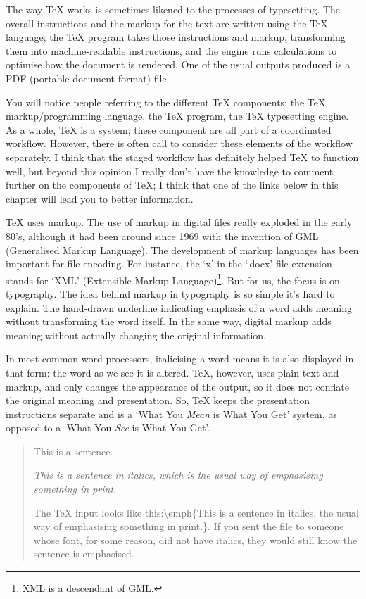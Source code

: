 \documentclass[11pt, oneside]{memoir}
\begin{document}
The way TeX works is sometimes likened to the processes of typesetting. The overall instructions and the markup for the text are written using the TeX language; the TeX program takes those instructions and markup, transforming them into machine-readable instructions, and the engine runs calculations to optimise how the document is rendered. One of the usual outputs produced is a PDF (portable document format) file.

You will notice people referring to the different TeX components: the TeX markup/programming language, the TeX program, the TeX typesetting engine. As a whole, TeX is a system; these component are all part of a coordinated workflow. However, there is often call to consider these elements of the workflow separately. I think that the staged workflow has definitely helped TeX to function well, but beyond this opinion I really don't have the knowledge to comment further on the components of TeX; I think that one of the links below in this chapter will lead you to better information.

TeX uses markup. The use of markup in digital files really exploded in the early 80's, although it had been around since 1969 with the invention of GML (Generalised Markup Language). The development of markup languages has been important for file encoding. For instance, the `x' in the `.docx' file extension stands for `XML' (Extensible Markup Language)\footnote{XML is a descendant of GML.}. But for us, the focus is on typography. The idea behind markup in typography is so simple it's hard to explain. The hand-drawn underline indicating emphasis of a word adds meaning without transforming the word itself. In the same way, digital markup adds meaning without actually changing the original information. 

In most common word processors, italicising a word means it is also displayed in that form: the word as we see it is altered. TeX, however, uses plain-text and markup, and only changes the appearance of the output, so it does not conflate the original meaning and presentation. So, TeX keeps the presentation instructions separate and is a `What You \emph{Mean} is What You Get' system, as opposed to a `What You \emph{See} is What You Get'.

\begin{quotation}
This is a sentence. 

\emph{This is a sentence in italics, which is the usual way of emphasising something in print.}

The TeX input looks like this:\gc \textbackslash emph\{This is a sentence in italics, the usual way of emphasising something in print.\}. \nf If you sent the file to someone whose font, for some reason, did not have italics, they would still know the sentence is emphasised.
\end{quotation}
\end{document}

